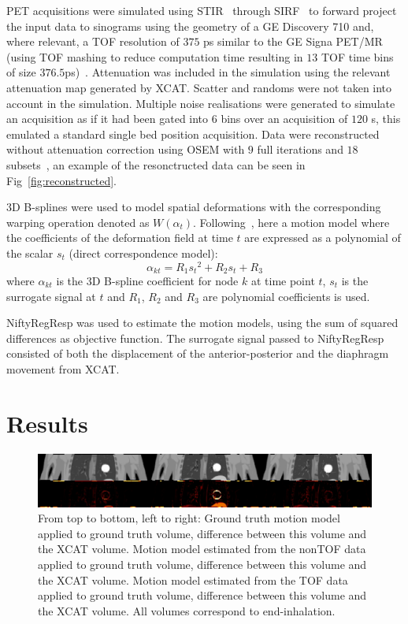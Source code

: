 \documentclass[journal]{IEEEtran}
\begin{document}
PET acquisitions were simulated using STIR~\cite{Thielemans2012} through SIRF~\cite{Ovtchinnikov2017} to forward project the input data to sinograms using the geometry of a GE Discovery 710 and, where relevant, a TOF resolution of $375$ ps similar to the GE Signa PET/MR (using TOF mashing to reduce computation time resulting in $13$ TOF time bins of size $376.5$ps)~\cite{Efthimiou2018}. Attenuation was included in the simulation using the relevant attenuation map generated by XCAT. Scatter and randoms were not taken into account in the simulation. Multiple noise realisations were generated to simulate an acquisition as if it had been gated into $6$ bins over an acquisition of $120$ s, this emulated a standard single bed position acquisition. Data were reconstructed without attenuation correction using OSEM with $9$ full iterations and $18$ subsets~\cite{Hudson1994}, an example of the resonctructed data can be seen in Fig~\ref{fig:reconstructed}. 

3D B-splines were used to model spatial deformations with the corresponding warping operation denoted as $W(\alpha_t)$. Following~\cite{McClelland2013}, here a motion model where the coefficients of the deformation field at time $t$ are expressed as a polynomial of the scalar $s_t$ (direct correspondence model):
\begin{equation}
    \alpha_{kt} = R_1 {s_t}^2 + R_2 s_t + R_3
\end{equation}
\noindent where $\alpha_{kt}$ is the 3D B-spline coefficient for node $k$ at time point $t$, $s_t$ is the surrogate signal at $t$ and $R_1$, $R_2$ and $R_3$ are polynomial coefficients is used. 

NiftyRegResp was used to estimate the motion models, using the sum of squared differences as objective function. The surrogate signal passed to NiftyRegResp consisted of both the displacement of the anterior-posterior and the  diaphragm movement from XCAT.

\section{Results}
\begin{figure}
    \centering
    \includegraphics[scale=0.35]{figures/momo.png}
    \caption{From top to bottom, left to right: Ground truth motion model applied to ground truth volume, difference between this volume and the XCAT volume. Motion model estimated from the nonTOF data applied to ground truth volume, difference between this volume and the XCAT volume. Motion model estimated from the TOF data applied to ground truth volume, difference between this volume and the XCAT volume. All volumes correspond to end-inhalation.}
    \label{fig:momo}
\end{figure}
\end{document}
